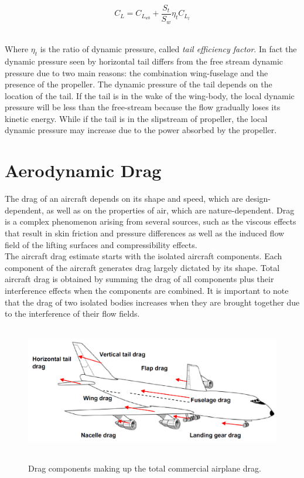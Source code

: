 \begin{equation}
C_L = C_{L_{wb}} + \frac{S_t}{S_w} \eta_t C_{L_{t}}
\end{equation}

\noindent \\ 
Where $\eta_t$ is the ratio of dynamic pressure, called {\itshape tail efficiency factor}. In fact the dynamic pressure seen by horizontal tail differs from the free stream dynamic pressure due to two main reasons: the combination wing-fuselage and the presence of the propeller. The dynamic pressure of the tail depends on the location of the tail. If the tail is in the wake of the wing-body, the local dynamic pressure will be less than the free-stream because the flow gradually loses its kinetic energy. While if the tail is in the slipstream of propeller, the local dynamic pressure may increase due to the power absorbed by the propeller.



\section{Aerodynamic Drag}
The drag of an aircraft depends on its shape and speed, which are design-dependent, as well as on the properties of air, which are nature-dependent. Drag is a complex phenomenon arising from several sources, such as the viscous effects that result in skin friction and pressure differences as well as the induced flow field of the lifting surfaces and compressibility effects. \\
The aircraft drag estimate starts with the isolated aircraft components. Each component of the aircraft generates drag largely dictated by its shape. Total aircraft drag is obtained by summing the drag of all components plus their interference effects when the components are combined. It is important to note that the drag of two isolated bodies increases when they are brought together due to the interference of their flow fields.\cite{kundu}

\begin{figure}[H]
\centering
{\includegraphics[height=5.6cm]{Immagini/dragcomponent.png}} 
\label{drag}
\caption{Drag components making up the total commercial airplane drag.\cite{sforza2014commercial}}
\end{figure} 		

